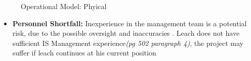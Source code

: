\documentclass[12pt]{article} %
\begin{document}
		\begin{figure}[H] %
			\caption{Operational Model: Phyical}
			\label{fig:speciation}
		\end{figure}
	
	
	
	
	
	
	
	
	
	\begin{itemize} 
		\item \textbf{Personnel Shortfall:} Inexperience in the management team is a potential risk, due to the possible oversight and inaccuracies . Leach does not have sufficient IS Management experience\textit{(pg 502 paragraph 4)}, the project may suffer if leach continues
		at his current position 
		
	\end{itemize}
	
\end{document}
